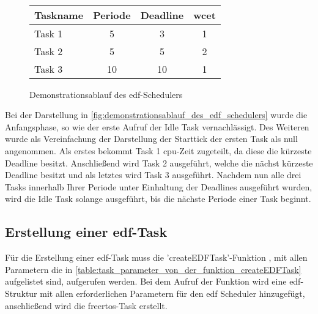 \documentclass[../EDF Master Thesis.tex]{subfiles}
\begin{document}
\begin{figure}[ht!]
\begin{tikzpicture}
        \end{tikzpicture}\\
        \vspace {1cm}
        \begin{tabular}{l|c|c|c}
            Taskname & Periode & Deadline & \ac{wcet} \\
            \hline
            Task 1 & 5 & 3 & 1 \\
            Task 2 & 5 & 5 & 2 \\
            Task 3 & 10 & 10 & 1 
        \end{tabular}
        \caption{Demonstrationsablauf des \ac{edf}-Schedulers}
        \label{fig:demonstrationsablauf_des_edf_schedulers}
    \end{figure}

    Bei der Darstellung in \autoref{fig:demonstrationsablauf_des_edf_schedulers} wurde die Anfangsphase, so wie der erste Aufruf der Idle Task vernachlässigt.
    Des Weiteren wurde als Vereinfachung der Darstellung der Starttick der ersten Task als null angenommen.
    Als erstes bekommt Task 1 \ac{cpu}-Zeit zugeteilt, da diese die kürzeste Deadline besitzt.
    Anschließend wird Task 2 ausgeführt, welche die nächst kürzeste Deadline besitzt und als letztes wird Task 3 ausgeführt.
    Nachdem nun alle drei Tasks innerhalb Ihrer Periode unter Einhaltung der Deadlines ausgeführt wurden, wird die Idle Task solange ausgeführt, bis die nächste Periode einer Task beginnt.


\subsection{Erstellung einer \acf{edf}-Task} \label{section:erstellung_einer_edf_task}

    Für die Erstellung einer \ac{edf}-Task muss die 'createEDFTask'-Funktion , mit allen Parametern die in \autoref{table:task_parameter_von_der_funktion_createEDFTask} aufgelistet sind, aufgerufen werden.
    Bei dem Aufruf der Funktion wird eine \ac{edf}-Struktur mit allen erforderlichen Parametern für den \ac{edf} Scheduler hinzugefügt, anschließend wird die \ac{freertos}-Task erstellt.
\end{document}
